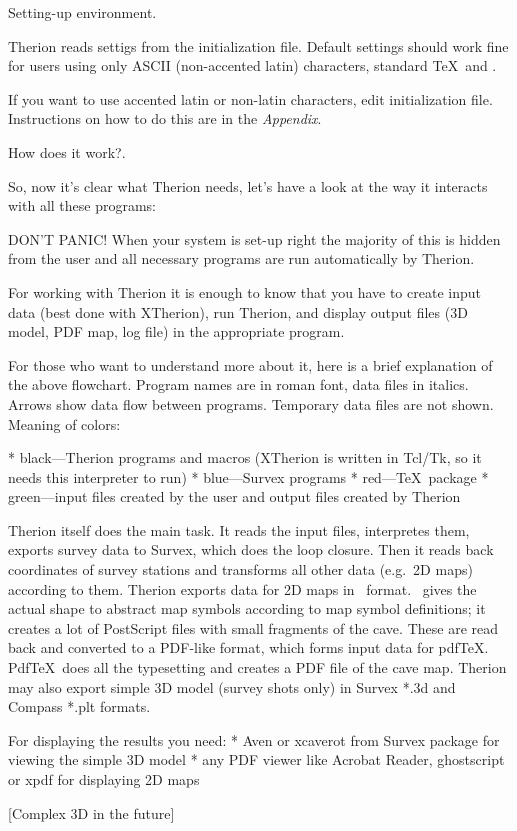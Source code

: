 \subsubchapter Setting-up environment.

Therion reads settigs from the initialization file. Default settings should 
work fine for users using only ASCII (non-accented latin) characters, 
standard \TeX\ and \MP. 

If you want to use accented latin or non-latin characters, edit initialization 
file. Instructions on how to do this are in the {\it Appendix}.


\subchapter How does it work?.

So, now it's clear what Therion needs, let's have a look at the way 
it interacts with all these programs:


DON'T PANIC! When your system is set-up right the majority of this is hidden from 
the user and all necessary programs are run automatically by Therion. 

For working with Therion it is enough to know that you have to create input data 
(best done with XTherion), run Therion, and display output files 
(3D model, PDF map, log file) in the appropriate program. 

For those who want to understand more about it, here is a brief explanation of 
the above flowchart. Program names are in roman font, data files in italics. 
Arrows show data flow between programs. Temporary data files are not shown. 
Meaning of colors:

\list
* black---Therion programs and macros (XTherion is written in Tcl/Tk,
  so it needs this interpreter to run)
* blue---Survex programs
* red---\TeX\ package
* green---input files created by the user and output files created by Therion
\endlist

Therion itself does the main task. It reads the input files, interpretes them, 
exports survey data to Survex, which does the loop closure. Then it reads back 
coordinates of survey stations and transforms all other data (e.g.~2D maps) 
according to them. Therion exports data for 2D maps in \MP\ format. \MP\ gives 
the actual shape to abstract map symbols according to map symbol definitions; it
creates a lot of PostScript files with small fragments of the cave. These are 
read back and converted to a PDF-like format, which forms input data 
for pdf\TeX. Pdf\TeX\ does all the typesetting and creates a PDF file of the cave 
map. Therion may also export simple 3D model (survey shots only) in Survex *.3d 
and Compass *.plt formats. 

For displaying the results you need:
\list
* Aven or xcaverot from Survex package for viewing the simple 3D model
* any PDF viewer like Acrobat Reader, ghostscript or xpdf for displaying  
  2D maps
\endlist

[Complex 3D in the future]





\endinput
